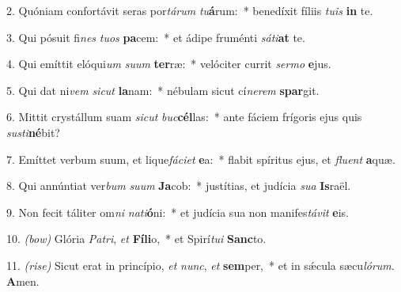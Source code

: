 2. Quóniam confortávit seras por\textit{tá}\textit{rum} \textit{tu}\textbf{á}rum:~* 
	benedíxit fíliis \textit{tu}\textit{is} \textbf{in} te.

3. Qui pósuit fi\textit{nes} \textit{tu}\textit{os} \textbf{pa}cem:~* 
	et ádipe fruménti \textit{sá}\textit{ti}\textbf{at} te.

4. Qui emíttit elóqui\textit{um} \textit{su}\textit{um} \textbf{ter}ræ:~* 
	velóciter currit \textit{ser}\textit{mo} \textbf{e}jus.

5. Qui dat ni\textit{vem} \textit{sic}\textit{ut} \textbf{la}nam:~* 
	nébulam sicut cí\textit{ne}\textit{rem} \textbf{spar}git.

6. Mittit crystállum suam \textit{sic}\textit{ut} \textit{buc}\textbf{cél}las:~* 
	ante fáciem frígoris ejus quis \textit{sus}\textit{ti}\textbf{né}bit?

7. Emíttet verbum suum, et lique\textit{fá}\textit{ci}\textit{et} \textbf{e}a:~* 
	flabit spíritus ejus, et \textit{flu}\textit{ent} \textbf{a}quæ.

8. Qui annúntiat ver\textit{bum} \textit{su}\textit{um} \textbf{Ja}cob:~* 
	justítias, et judícia \textit{su}\textit{a} \textbf{Is}raël.

9. Non fecit táliter om\textit{ni} \textit{na}\textit{ti}\textbf{ó}ni:~* 
	et judícia sua non manifes\textit{tá}\textit{vit} \textbf{e}is.

10. {\color{red}\textit{(bow)}} Glória \textit{Pa}\textit{tri}, \textit{et} \textbf{Fí}\textbf{li}o,~* 
	et Spirí\textit{tu}\textit{i} \textbf{Sanc}to.

11. {\color{red}\textit{(rise)}} Sicut erat in princípio, \textit{et} \textit{nunc}, \textit{et} \textbf{sem}per,~* 
	et in s\'{\ae}cula sæcu\textit{ló}\textit{rum}. \textbf{A}men.